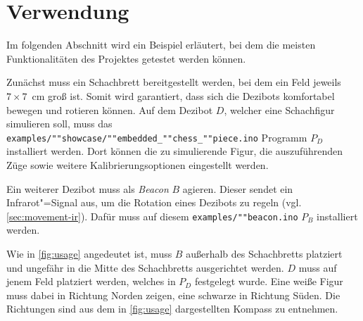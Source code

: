 
\section{Verwendung}

Im folgenden Abschnitt wird ein Beispiel erläutert, bei dem die meisten Funktionalitäten des Projektes getestet werden können.

Zunächst muss ein Schachbrett bereitgestellt werden, bei dem ein Feld jeweils \mbox{$7\times7$~cm} groß ist. Somit wird garantiert, dass sich die Dezibots komfortabel bewegen und rotieren können. Auf dem Dezibot $D$, welcher eine Schachfigur simulieren soll, muss das \texttt{examples/""showcase/""embedded\_""chess\_""piece.ino} Programm $P_D$ installiert werden. Dort können die zu simulierende Figur, die auszuführenden Züge sowie weitere Kalibrierungsoptionen eingestellt werden.

Ein weiterer Dezibot muss als \emph{Beacon} $B$ agieren. Dieser sendet ein Infrarot"=Signal aus, um die Rotation eines Dezibots zu regeln (vgl. \autoref{sec:movement-ir}). Dafür muss auf diesem \texttt{examples/""beacon.ino} $P_B$ installiert werden.

Wie in \autoref{fig:usage} angedeutet ist, muss $B$ außerhalb des Schachbretts platziert und ungefähr in die Mitte des Schachbretts ausgerichtet werden. $D$ muss auf jenem Feld platziert werden, welches in $P_D$ festgelegt wurde. Eine weiße Figur muss dabei in Richtung Norden zeigen, eine schwarze in Richtung Süden. Die Richtungen sind aus dem in \autoref{fig:usage} dargestellten Kompass zu entnehmen.

